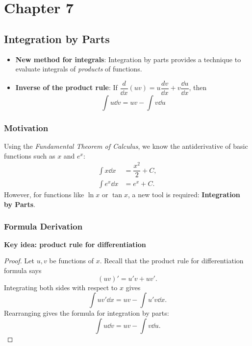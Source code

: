 \section{Chapter 7}
\subsection{Integration by Parts}  
\begin{center}
\begin{tcolorbox}
    \begin{itemize}
        \item \textbf{New method for integrals}: Integration by parts provides a technique to evaluate integrals of \textit{products} of functions.
        \item \textbf{Inverse of the product rule}: If $ \dfrac{d}{\dd x}(uv) = u \dfrac{dv}{\dd x} + v \dfrac{\dd u}{\dd x} $, then
        \begin{equation}
            \int u \dd v = uv - \int v \dd u \tag{IBP}
        \end{equation}
    \end{itemize}
\end{tcolorbox}
\end{center}

\subsubsection{Motivation}
Using the \textit{Fundamental Theorem of Calculus}, we know the antiderivative of basic functions such as $x$ and $e^x$:
\begin{align*}
\int x \dd x &= \dfrac{x^2}{2} + C, \\
\int e^x \dd x &= e^x + C.
\end{align*}
However, for functions like $\ln x$ or $\tan x$, a new tool is required: \textbf{Integration by Parts}. 

\subsubsection{Formula Derivation}
\textbf{Key idea: product rule for differentiation}

\begin{proof}
    Let $u,v$ be functions of $x$. Recall that the product rule for differentiation formula says
    \[(uv)' = u'v + uv'. \]
    Integrating both sides with respect to $x$ gives
    \[\int uv' \dd x = uv - \int u'v \dd x.\]
    Rearranging gives the formula for integration by parts:
    \[ \int u \dd v = uv - \int v \dd u. \]
\end{proof}


